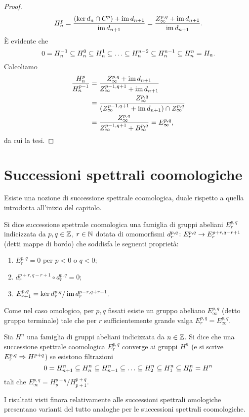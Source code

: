 \begin{proof}
$$
H^p_n=\frac{(\ker d_n\cap C^p)+\operatorname{im} d_{n+1}}{\operatorname{im} d_{n+1}}=\frac{Z^{p,q}_\infty+\operatorname{im} d_{n+1}}{\operatorname{im} d_{n+1}}.
$$
È evidente che
$$
0=H^{-1}_n\subseteq H^0_n\subseteq H^1_n\subseteq\ldots\subseteq H^{n-2}_n\subseteq H^{n-1}_n\subseteq H^n_n=H_n.
$$
Calcoliamo
\begin{align*}
\frac{H^p_n}{H^{p-1}_n}&=\frac{Z^{p,q}_\infty+\operatorname{im} d_{n+1}}{Z^{p-1,q+1}_\infty+\operatorname{im} d_{n+1}}\\
&=\frac{Z^{p,q}_\infty}{(Z^{p-1,q+1}_\infty+\operatorname{im} d_{n+1})\cap Z^{p,q}_\infty}\\
&=\frac{Z^{p,q}_\infty}{Z^{p-1,q+1}_\infty+B^{p,q}_\infty}=E^{p,q}_\infty,
\end{align*}
da cui la tesi.
\end{proof}

\section{Successioni spettrali coomologiche}

Esiste una nozione di successione spettrale coomologica, duale rispetto a quella introdotta all'inizio del capitolo.

\begin{definition}
Si dice successione spettrale coomologica una famiglia di gruppi abeliani $E^{p,q}_r$ indicizzata da $p,q\in\mathbb{Z}$, $r\in\mathbb{N}$ dotata di omomorfismi $d^{p,q}_r\colon E^{p,q}_r\to E^{p+r,q-r+1}_r$ (detti mappe di bordo) che soddisfa le seguenti proprietà:
\begin{enumerate}
\item $E^{p,q}_r=0$ per $p<0$ o $q<0$;
\item $d^{p+r,q-r+1}_r\circ d^{p,q}_r=0$;
\item $E^{p,q}_{r+1}=\ker d^{p,q}_r/\operatorname{im} d^{p-r,q+r-1}_r$.
\end{enumerate}
\end{definition}
Come nel caso omologico, per $p,q$ fissati esiste un gruppo abeliano $E^{p,q}_\infty$ (detto gruppo terminale) tale che per $r$ sufficientemente grande valga $E^{p,q}_r=E^{p,q}_\infty$.
\begin{definition}
Sia $H^n$ una famiglia di gruppi abeliani indicizzata da $n\in\mathbb{Z}$.
Si dice che una successione spettrale coomologica $E^{p,q}_r$ converge ai gruppi $H^n$ (e si scrive $E^{p,q}_r\Rightarrow H^{p+q}$) se esistono filtrazioni
$$
0=H^n_{n+1}\subseteq H^n_n\subseteq H^n_{n-1}\subseteq\ldots\subseteq H^n_2\subseteq H^n_1\subseteq H^n_0=H^n
$$
tali che $E^{p,q}_\infty=H^{p+q}_p/H^{p+q}_{p+1}$.
\end{definition}
I risultati visti finora relativamente alle successioni spettrali omologiche presentano varianti del tutto analoghe per le successioni spettrali coomologiche.

